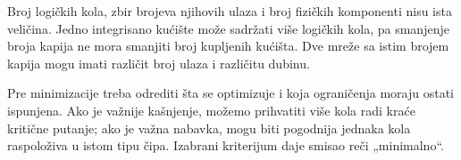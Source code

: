 
Broj logičkih kola, zbir brojeva njihovih ulaza i broj fizičkih komponenti nisu ista veličina. Jedno integrisano kućište može sadržati više logičkih kola, pa smanjenje broja kapija ne mora smanjiti broj kupljenih kućišta. Dve mreže sa istim brojem kapija mogu imati različit broj ulaza i različitu dubinu.

Pre minimizacije treba odrediti šta se optimizuje i koja ograničenja moraju ostati ispunjena. Ako je važnije kašnjenje, možemo prihvatiti više kola radi kraće kritične putanje; ako je važna nabavka, mogu biti pogodnija jednaka kola raspoloživa u istom tipu čipa. Izabrani kriterijum daje smisao reči „minimalno“.
